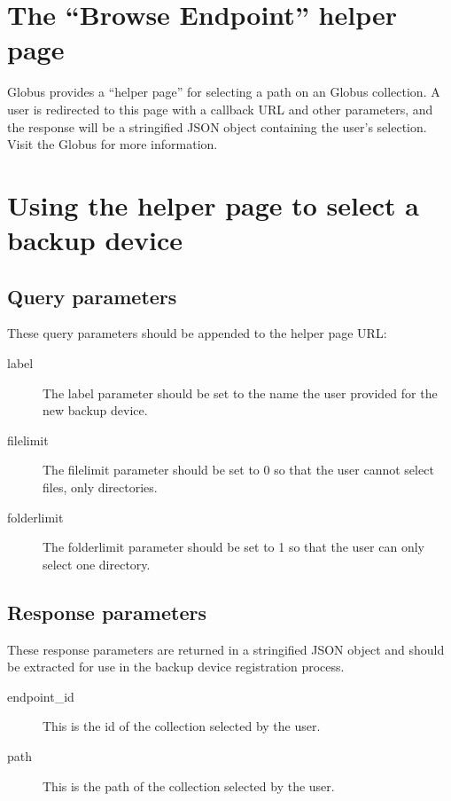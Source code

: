 
\section{The ``Browse Endpoint'' helper page}

Globus provides a ``helper page'' for selecting a path on an Globus collection.
A user is redirected to this page with a callback URL and other parameters, and
the response will be a stringified JSON object containing the user's selection.
Visit the Globus  for more information.

\section{Using the helper page to select a backup device}

\subsection{Query parameters}

These query parameters should be appended to the helper page URL:
\begin{description}
    \item[label] The label parameter should be set to the name the user provided 
    for the new backup device.
    \item[filelimit] The filelimit parameter should be set to 0 so that the user
    cannot select files, only directories.
    \item[folderlimit] The folderlimit parameter should be set to 1 so that the 
    user can only select one directory.
\end{description}

\subsection{Response parameters}

These response parameters are returned in a stringified JSON object and should
be extracted for use in the backup device registration process.

\begin{description}
    \item[endpoint\_id] This is the id of the collection selected by the user.
    \item[path] This is the path of the collection selected by the user.
\end{description}